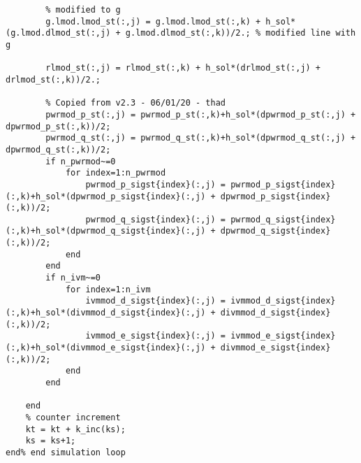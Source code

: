 \documentclass[12pt]{article}
\begin{document}
\begin{verbatim}
        % modified to g
        g.lmod.lmod_st(:,j) = g.lmod.lmod_st(:,k) + h_sol*(g.lmod.dlmod_st(:,j) + g.lmod.dlmod_st(:,k))/2.; % modified line with g
        
        rlmod_st(:,j) = rlmod_st(:,k) + h_sol*(drlmod_st(:,j) + drlmod_st(:,k))/2.;
        
        % Copied from v2.3 - 06/01/20 - thad
        pwrmod_p_st(:,j) = pwrmod_p_st(:,k)+h_sol*(dpwrmod_p_st(:,j) + dpwrmod_p_st(:,k))/2;
        pwrmod_q_st(:,j) = pwrmod_q_st(:,k)+h_sol*(dpwrmod_q_st(:,j) + dpwrmod_q_st(:,k))/2;
        if n_pwrmod~=0
            for index=1:n_pwrmod
                pwrmod_p_sigst{index}(:,j) = pwrmod_p_sigst{index}(:,k)+h_sol*(dpwrmod_p_sigst{index}(:,j) + dpwrmod_p_sigst{index}(:,k))/2;
                pwrmod_q_sigst{index}(:,j) = pwrmod_q_sigst{index}(:,k)+h_sol*(dpwrmod_q_sigst{index}(:,j) + dpwrmod_q_sigst{index}(:,k))/2;
            end
        end
        if n_ivm~=0
            for index=1:n_ivm
                ivmmod_d_sigst{index}(:,j) = ivmmod_d_sigst{index}(:,k)+h_sol*(divmmod_d_sigst{index}(:,j) + divmmod_d_sigst{index}(:,k))/2;
                ivmmod_e_sigst{index}(:,j) = ivmmod_e_sigst{index}(:,k)+h_sol*(divmmod_e_sigst{index}(:,j) + divmmod_e_sigst{index}(:,k))/2;
            end
        end
        
    end
    % counter increment
    kt = kt + k_inc(ks);
    ks = ks+1;
end% end simulation loop
\end{verbatim}
\end{document}
